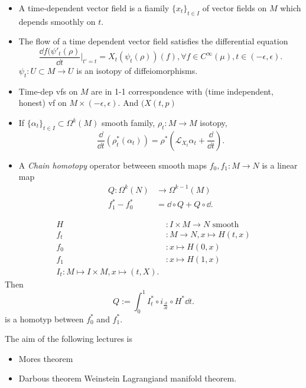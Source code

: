
\begin{revision}
	\begin{itemize}
		\item A time-dependent vector field is a fiamily $\{x_t\} _{t \in I}$ of vector fields on  $M$ which depends smoothly on $t$. 
		\item The flow of a  time dependent vector field satisfies the differential equation \[
				\frac{\dd f(\psi'_t(\rho)}{\dd t}|_{t' = t} = X_{t}(\psi_t(\rho))(f), \forall  f \in C^{\infty}(\mu), t \in (-\epsilon, \epsilon)
		.\] 
		$\psi_t: U \subset M \to U$ is an isotopy of diffeiomorphisms.
	\item Time-dep vfs on $M$ are in 1-1 correspondence with (time independent, honest) vf on $M \times (-\epsilon, \epsilon)$.
		And  $(X(t, p)$
	\item If  $\{\alpha_t\} _{t 
		\in I} \subset \Omega^{k}(M) $ smooth family, $\rho_t:M\to M$ isotopy, 
		\[
			\frac{\dd}{\dd t}(\rho^*_t(\alpha_t)) = \rho^*(\mathcal{L} _{X_t} \alpha_t + \frac{\dd }{\dd t})
		.\] 
	\item A \emph{Chain homotopy} operator betweeen smooth maps $f_0, f_1: M \to N$ is a linear map \begin{align*}
			Q: \Omega^{k}(N) &\longrightarrow \Omega^{k-1}(M) \\
		f^*_1 - f^*_0 &= \dd \circ Q + Q \circ \dd
	.\end{align*}
	\end{itemize}
\end{revision}

\begin{notation}
	\begin{align*}
		H&: I\times M \to N \text{ smooth}\\
		f_t&: M \to N, x\mapsto  H(t, x) \\
		f_0&: x\mapsto H(0, x) \\
		f_1&: x\mapsto H(1, x)\\
		I_t: M \mapsto  I\times M, x\mapsto (t, X) 
	.\end{align*}
	Then \[
	Q := \int_0^{1}I_t^*\circ i_{\frac{\partial }{\partial t} }\circ H^* \dd t
.\] is a homotyp between $f^*_0$ and $f^*_1$.
\end{notation}

The aim of the following lectures is 
\begin{itemize}
	\item  Mores theorem
	\item Darbous theorem
		\time Weinstein Lagrangiand manifold theorem.
\end{itemize}	

